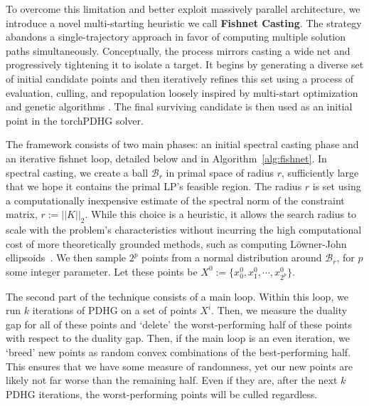 \documentclass[twoside,12pt,openright]{report}  %
\begin{document}
To overcome this limitation and better exploit massively parallel architecture, we introduce a novel multi-starting heuristic we call \textbf{Fishnet Casting}. The strategy abandons a single-trajectory approach in favor of computing multiple solution paths simultaneously. Conceptually, the process mirrors casting a wide net and progressively tightening it to isolate a target. It begins by generating a diverse set of initial candidate points and then iteratively refines this set using a process of evaluation, culling, and repopulation loosely inspired by multi-start optimization \cite{MARTI20131} and genetic algorithms \cite{Manning-genetic}. The final surviving candidate is then used as an initial point in the torchPDHG solver.

The framework consists of two main phases: an initial spectral casting phase and an iterative fishnet loop, detailed below and in Algorithm~\ref{alg:fishnet}. In spectral casting, we create a ball $\mathcal{B}_r$ in primal space of radius $r$, sufficiently large that we hope it contains the primal LP's feasible region. The radius $r$ is set using a computationally inexpensive estimate of the spectral norm of the constraint matrix, $r := ||K||_2$. While this choice is a heuristic, it allows the search radius to scale with the problem's characteristics without incurring the high computational cost of more theoretically grounded methods, such as computing Löwner-John ellipsoids~\cite{henk2012lowner}. We then sample $2^p$ points from a normal distribution around $\mathcal{B}_r$, for $p$ some integer parameter. Let these points be $X^0 := \{x_0^0,x_1^0,\cdots,x_{2^p}^0\}$.

The second part of the technique consists of a main loop. Within this loop, we run $k$ iterations of PDHG on a set of points $X^i$. Then, we measure the duality gap for all of these points and `delete' the worst-performing half of these points with respect to the duality gap. Then, if the main loop is an even iteration, we `breed' new points as random convex combinations of the best-performing half. This ensures that we have some measure of randomness, yet our new points are likely not far worse than the remaining half. Even if they are, after the next $k$ PDHG iterations, the worst-performing points will be culled regardless.
\end{document}
